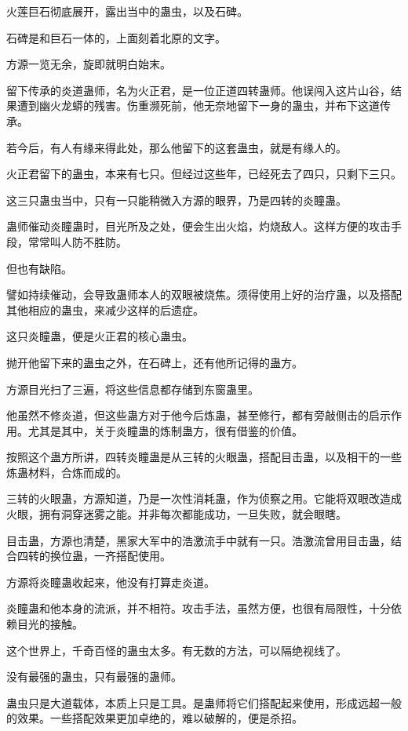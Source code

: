 \begin{this_body}
火莲巨石彻底展开，露出当中的蛊虫，以及石碑。

石碑是和巨石一体的，上面刻着北原的文字。

方源一览无余，旋即就明白始末。

留下传承的炎道蛊师，名为火正君，是一位正道四转蛊师。他误闯入这片山谷，结果遭到幽火龙蟒的残害。伤重濒死前，他无奈地留下一身的蛊虫，并布下这道传承。

若今后，有人有缘来得此处，那么他留下的这套蛊虫，就是有缘人的。

火正君留下的蛊虫，本来有七只。但经过这些年，已经死去了四只，只剩下三只。

这三只蛊虫当中，只有一只能稍微入方源的眼界，乃是四转的炎瞳蛊。

蛊师催动炎瞳蛊时，目光所及之处，便会生出火焰，灼烧敌人。这样方便的攻击手段，常常叫人防不胜防。

但也有缺陷。

譬如持续催动，会导致蛊师本人的双眼被烧焦。须得使用上好的治疗蛊，以及搭配其他相应的蛊虫，来减少这样的后遗症。

这只炎瞳蛊，便是火正君的核心蛊虫。

抛开他留下来的蛊虫之外，在石碑上，还有他所记得的蛊方。

方源目光扫了三遍，将这些信息都存储到东窗蛊里。

他虽然不修炎道，但这些蛊方对于他今后炼蛊，甚至修行，都有旁敲侧击的启示作用。尤其是其中，关于炎瞳蛊的炼制蛊方，很有借鉴的价值。

按照这个蛊方所讲，四转炎瞳蛊是从三转的火眼蛊，搭配目击蛊，以及相干的一些炼蛊材料，合炼而成的。

三转的火眼蛊，方源知道，乃是一次性消耗蛊，作为侦察之用。它能将双眼改造成火眼，拥有洞穿迷雾之能。并非每次都能成功，一旦失败，就会眼瞎。

目击蛊，方源也清楚，黑家大军中的浩激流手中就有一只。浩激流曾用目击蛊，结合四转的换位蛊，一齐搭配使用。

方源将炎瞳蛊收起来，他没有打算走炎道。

炎瞳蛊和他本身的流派，并不相符。攻击手法，虽然方便，也很有局限性，十分依赖目光的接触。

这个世界上，千奇百怪的蛊虫太多。有无数的方法，可以隔绝视线了。

没有最强的蛊虫，只有最强的蛊师。

蛊虫只是大道载体，本质上只是工具。是蛊师将它们搭配起来使用，形成远超一般的效果。一些搭配效果更加卓绝的，难以破解的，便是杀招。


\end{this_body}
